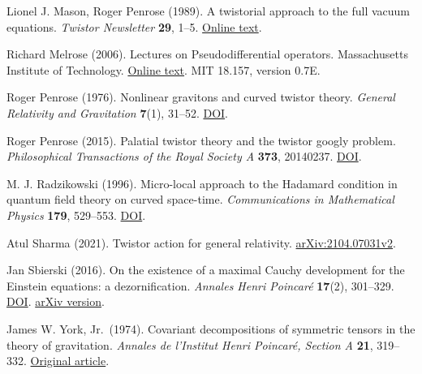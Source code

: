\documentclass[
  english,
  11pt,
  reqno]{amsart}
\begin{document}
\leavevmode{}\label{ref-MasonPenrose1989}Lionel J. Mason, Roger Penrose (1989). A twistorial approach to the full
vacuum equations. \emph{Twistor Newsletter} \textbf{29}, 1--5.
\href{https://people.maths.ox.ac.uk/lmason/Tn/29/TN29-02.pdf}{Online
text}.

\leavevmode{}\label{ref-Melrose2006}Richard Melrose (2006). Lectures on Pseudodifferential operators.
Massachusetts Institute of Technology.
\href{https://math.mit.edu/~rbm/18.157-F05.pdf}{Online text}. MIT
18.157, version 0.7E.

\leavevmode{}\label{ref-Penrose1976}Roger Penrose (1976). Nonlinear gravitons and curved twistor theory.
\emph{General Relativity and Gravitation} \textbf{7}(1), 31--52.
\href{https://doi.org/10.1007/BF00762011}{DOI}.

\leavevmode{}\label{ref-Penrose2015}Roger Penrose (2015). Palatial twistor theory and the twistor googly
problem. \emph{Philosophical Transactions of the Royal Society A}
\textbf{373}, 20140237.
\href{https://doi.org/10.1098/rsta.2014.0237}{DOI}.

\leavevmode{}\label{ref-Radzikowski1996}M. J. Radzikowski (1996). Micro-local approach to the Hadamard condition
in quantum field theory on curved space-time. \emph{Communications in
Mathematical Physics} \textbf{179}, 529--553.
\href{https://doi.org/10.1007/BF02100096}{DOI}.

\leavevmode{}\label{ref-Sharma2021}Atul Sharma (2021). Twistor action for general relativity.
\href{https://arxiv.org/abs/2104.07031v2}{arXiv:2104.07031v2}.

\leavevmode{}\label{ref-Sbierski2016}Jan Sbierski (2016). On the existence of a maximal Cauchy development
for the Einstein equations: a dezornification. \emph{Annales Henri
Poincaré} \textbf{17}(2), 301--329.
\href{https://doi.org/10.1007/s00023-015-0401-5}{DOI}.
\href{https://arxiv.org/abs/1309.7591v3}{arXiv version}.

\leavevmode{}\label{ref-York1974}James W. York, Jr.~(1974). Covariant decompositions of symmetric tensors
in the theory of gravitation. \emph{Annales de l'Institut Henri
Poincaré, Section A} \textbf{21}, 319--332.
\href{https://www.numdam.org/item/AIHPA_1974__21_4_319_0/}{Original
article}.
\end{document}
